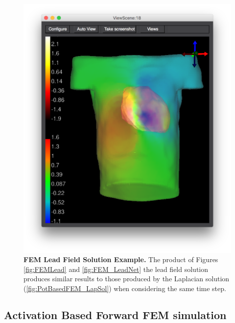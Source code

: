 \begin{figure}[H]
\begin{center}
\includegraphics[width=\textwidth]{ECGToolkitGuide_figures/PotBasedFEM_LeadSol.png}
\caption{{\bf FEM Lead Field Solution Example.} The product of Figures \ref{fig:FEMLead} and \ref{fig:FEM_LeadNet} the lead field solution produces similar results to those produced by the Laplacian solution (\autoref{fig:PotBasedFEM_LapSol}) when considering the same time step.}
\label{fig:FEM_LeadSol}
\end{center}
\end{figure}

\subsection{Activation Based Forward FEM simulation}


